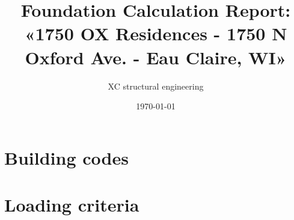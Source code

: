 

\usepackage{array, boldline, makecell, booktabs}
\newcommand\btrule[1]{\specialrule{#1}{0pt}{0pt}}
\usepackage{colortbl}
\usepackage{multicol,caption}               %
\usepackage[font={footnotesize}]{caption}
\usepackage{xcolor}
\newenvironment{Figure}
  {\par\medskip\noindent\minipage{\linewidth}}
  {\endminipage\par\medskip}

\title{Foundation Calculation Report: «1750 OX Residences - 1750 N Oxford Ave. - Eau Claire, WI» }
\author{XC structural engineering}
\date{\today}
\newcommand{\revision}{0.0}
\newcommand{\titdocum}{Foundation Calculation Report}

\maketitle
\tableofcontents
\listoftables
\listoffigures
\section{Building codes}

\section{Loading criteria}


